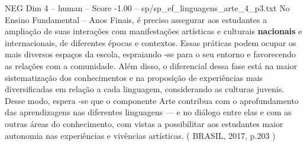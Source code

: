 \begin{textsample}{NEG Dim 4 – human – Score -1.00 – sp/sp\_ef\_linguagens\_arte\_4\_p3.txt}  \label{ex:f4_neg_019}
No Ensino Fundamental – Anos Finais, é preciso assegurar aos estudantes a ampliação de suas interações com manifestações artísticas e culturais \textbf{nacionais} e internacionais, de diferentes épocas e contextos.
Essas práticas podem ocupar os mais diversos espaços da escola, espraiando -se para o seu entorno e favorecendo as relações com a comunidade.
Além disso, o diferencial dessa fase está na maior sistematização dos conhecimentos e na proposição de experiências mais diversificadas em relação a cada linguagem, considerando as culturas juvenis.
Desse modo, espera -se que o componente Arte contribua com o aprofundamento das aprendizagens nas diferentes linguagens — e no diálogo entre elas e com as outras áreas do conhecimento, com vistas a possibilitar aos estudantes maior autonomia nas experiências e vivências artísticas. ( BRASIL, 2017, p.203 )

\end{textsample}
